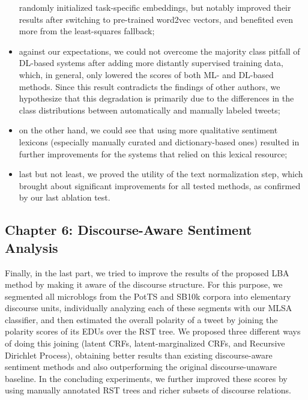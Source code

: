 \documentclass[11pt]{article}
\begin{document}
\begin{itemize}
    randomly initialized task-specific embeddings, but notably
    improved their results after switching to pre-trained word2vec
    vectors, and benefited even more from the least-squares fallback;
  \item against our expectations, we could not overcome the majority
    class pitfall of DL-based systems after adding more distantly
    supervised training data, which, in general, only lowered the
    scores of both ML- and DL-based methods.  Since this result
    contradicts the findings of other authors, we hypothesize that
    this degradation is primarily due to the differences in the class
    distributions between automatically and manually labeled tweets;
  \item on the other hand, we could see that using more qualitative
    sentiment lexicons (especially manually curated and
    dictionary-based ones) resulted in further improvements for the
    systems that relied on this lexical resource;
  \item last but not least, we proved the utility of the text
    normalization step, which brought about significant improvements
    for all tested methods, as confirmed by our last ablation test.
\end{itemize}

\subsection{Chapter 6: Discourse-Aware Sentiment Analysis}

Finally, in the last part, we tried to improve the results of the
proposed LBA method by making it aware of the discourse structure.
For this purpose, we segmented all microblogs from the PotTS and SB10k
corpora into elementary discourse units, individually analyzing each
of these segments with our MLSA classifier, and then estimated the
overall polarity of a tweet by joining the polarity scores of its EDUs
over the RST tree.  We proposed three different ways of doing this
joining (latent CRFs, latent-marginalized CRFs, and Recursive
Dirichlet Process), obtaining better results than existing
discourse-aware sentiment methods and also outperforming the original
discourse-unaware baseline.  In the concluding experiments, we further
improved these scores by using manually annotated RST trees and richer
subsets of discourse relations.
\end{document}

